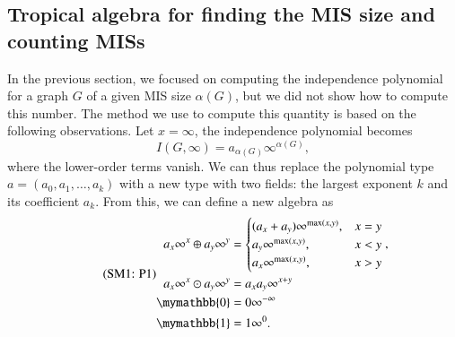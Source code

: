 \documentclass[onefignum, onetabnum]{siamart190516}
\newcommand{\eqname}[1]{\stepcounter{equation}\tag{\theequation : #1}}
\newcommand{\<}{\langle}
\renewcommand{\>}{\rangle}
\begin{document}
\subsection{Tropical algebra for finding the MIS size and counting MISs}
In the previous section, we focused on computing the independence polynomial for a graph $G$ of a given MIS size $\alpha(G)$, but we did not show how to compute this number.
The method we use to compute this quantity is based on the following observations. Let $x=\infty$, the independence polynomial becomes
\begin{equation}
I(G, \infty) = a_{\alpha(G)} \infty^{\alpha(G)},
\end{equation}
where the lower-order terms vanish. We can thus replace the polynomial type $a = (a_0, a_1, \ldots, a_k)$ with a new type with two fields: the largest exponent $k$ and its coefficient $a_k$.
From this, we can define a new algebra as
\begin{equation}
    \eqname{P1}
\begin{split}
    a_x\infty^x \oplus a_y\infty^y &= \begin{cases}
        (a_x + a_y)\infty^{\max(x,y)}, & x = y\\
        a_y\infty^{\max(x,y)}, & x < y\\
        a_x\infty^{\max(x,y)}, & x > y
    \end{cases}, \\
    a_x\infty^x \odot a_y\infty^y &= a_x a_y\infty^{x+y}\\
    \mymathbb{0} &= 0\infty^{-\infty}\\
    \mymathbb{1} &= 1\infty^{0}.
\end{split}%
\label{eq:countingtropical}
\end{equation}
\end{document}
